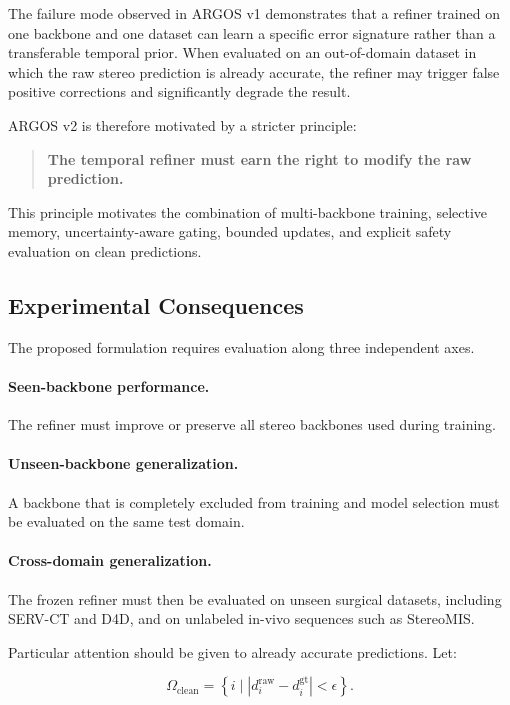 \documentclass[11pt,a4paper]{article}
\begin{document}
The failure mode observed in ARGOS v1 demonstrates that a refiner trained on one backbone and one dataset can learn a specific error signature rather than a transferable temporal prior. When evaluated on an out-of-domain dataset in which the raw stereo prediction is already accurate, the refiner may trigger false positive corrections and significantly degrade the result.

ARGOS v2 is therefore motivated by a stricter principle:

\begin{quote}
\textbf{The temporal refiner must earn the right to modify the raw prediction.}
\end{quote}

This principle motivates the combination of multi-backbone training, selective memory, uncertainty-aware gating, bounded updates, and explicit safety evaluation on clean predictions.

\subsection{Experimental Consequences}

The proposed formulation requires evaluation along three independent axes.

\paragraph{Seen-backbone performance.}
The refiner must improve or preserve all stereo backbones used during training.

\paragraph{Unseen-backbone generalization.}
A backbone that is completely excluded from training and model selection must be evaluated on the same test domain.

\paragraph{Cross-domain generalization.}
The frozen refiner must then be evaluated on unseen surgical datasets, including SERV-CT and D4D, and on unlabeled in-vivo sequences such as StereoMIS.

Particular attention should be given to already accurate predictions. Let:

\begin{equation}
\Omega_{\mathrm{clean}}
=
\left\{
i
\mid
\left|
d_i^{\mathrm{raw}}
-
d_i^{\mathrm{gt}}
\right|
<
\epsilon
\right\}.
\end{equation}
\end{document}
